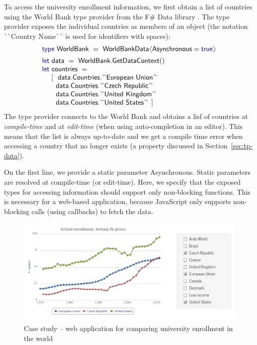 \documentclass[submission,copyright,creativecommons]{eptcs}
\newcommand{\langl}{\begin{picture}(4.5,7)
\put(1.1,2.5){\rotatebox{60}{\line(1,0){5.5}}}
\put(1.1,2.5){\rotatebox{300}{\line(1,0){5.5}}}
\end{picture}}
\newcommand{\rangl}{\begin{picture}(4.5,7)
\put(.9,2.5){\rotatebox{120}{\line(1,0){5.5}}}
\put(.9,2.5){\rotatebox{240}{\line(1,0){5.5}}}
\end{picture}}
\newcommand{\kvd}[1]{\textnormal{\textcolor{kvdclr}{\sffamily #1}}}
\newcommand{\ident}[1]{\textnormal{\sffamily #1}}
\newcommand{\lident}[1]{\textnormal{\sffamily 
  \`{}\hspace{-0.25em}\`{}\hspace{-0.1em}#1\`{}\hspace{-0.25em}\`{}}}
\begin{document}
To access the university enrollment information, we first obtain a list of countries using the 
World Bank type provider from the F\# Data library \cite{fsharp-data}. The type provider exposes 
the individual countries as members of an object (the notation \lident{Country Name} is used for 
identifiers with spaces):
%
\begin{equation*}
\begin{array}{l}
 \kvd{type}~\ident{WorldBank}~=~\ident{WorldBankData}\langl\ident{Asynchronous}=\kvd{true}\rangl
 \\[0.5em]
 \kvd{let}~\ident{data}~=~\ident{WorldBank.GetDataContext}() \\
 \kvd{let}~\ident{countries}~= \\
 \quad~\lbrack~~ \ident{data.Countries.}\lident{European Union} \\
 \qquad   \ident{data.Countries.}\lident{Czech Republic} \\
 \qquad   \ident{data.Countries.}\lident{United Kingdom} \\
 \qquad   \ident{data.Countries.}\lident{United States} ~\rbrack 
\end{array}
\end{equation*}
%
The type provider connects to the World Bank and obtains a lisf of countries at 
\emph{compile-time} and at \emph{edit-time} (when using auto-completion in an editor).
This means that the list is always up-to-date and we get a compile time error when accessing 
a country that no longer exists (a property discussed in Section~\ref{sec:tp-data}).

On the first line, we provide a static parameter \ident{Asynchronous}. Static parameters are 
resolved at compile-time (or edit-time). Here, we specify that the exposed types for accessing 
information should support only non-blocking functions. This is necessary for a web-based 
application, because JavaScript only supports non-blocking calls (using callbacks) to fetch the data. 


\begin{figure}[!t]
\hspace{3em} \includegraphics[width=35em]{worldbank.png}
\caption{Case study -- web application for comparing university enrollment in the world}
\label{fig:wb}
\end{figure}
\end{document}
